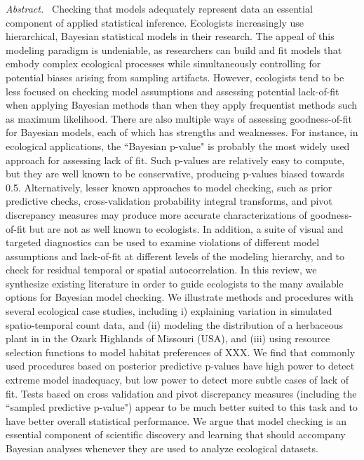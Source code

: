 \documentclass[12pt,english]{article}
\begin{document}
\begin{spacing}{1.9}
{\em Abstract.\ }  Checking that models adequately represent data an essential component of applied statistical inference.  Ecologists increasingly use hierarchical, Bayesian statistical models in their research.  The appeal of this modeling paradigm is undeniable, as researchers can build and fit models that embody complex ecological processes while simultaneously controlling for potential biases arising from sampling artifacts. However, ecologists tend to be less focused on checking model assumptions and assessing potential lack-of-fit when applying Bayesian methods than when they apply frequentist methods such as maximum likelihood.  There are also multiple ways of assessing goodness-of-fit for Bayesian models, each of which has strengths and weaknesses.  For instance, in ecological applications, the ``Bayesian p-value" is probably the most widely used approach for assessing lack of fit. Such p-values are relatively easy to compute, but they are well known to be conservative, producing p-values biased towards 0.5.  Alternatively, lesser known approaches to model checking, such as prior predictive checks, cross-validation probability integral transforms, and pivot discrepancy measures may produce more accurate characterizations of goodness-of-fit but are not as well known to ecologists.  In addition, a suite of visual and targeted diagnostics can be used to examine violations of different model assumptions and lack-of-fit at different levels of the modeling hierarchy, and to check for residual temporal or spatial autocorrelation.  In this review, we synthesize existing literature in order to guide ecologists to the many available options for Bayesian model checking.  We illustrate methods and procedures with several ecological case studies, including i) explaining variation in simulated spatio-temporal count data, and (ii) modeling the distribution of a herbaceous plant in in the Ozark Highlands of Missouri (USA), and (iii) using resource selection functions to model habitat preferences of XXX.  We find that commonly used procedures based on posterior predictive p-values have high power to detect extreme model inadequacy, but low power to detect more subtle cases of lack of fit.  Tests based on cross validation and pivot discrepancy measures (including the ``sampled predictive p-value") appear to be much better suited to this task and to have better overall statistical performance. We argue that model checking is an essential component of scientific discovery and learning that should accompany Bayesian analyses whenever they are used to analyze ecological datasets.  



\end{spacing}
\end{document}
